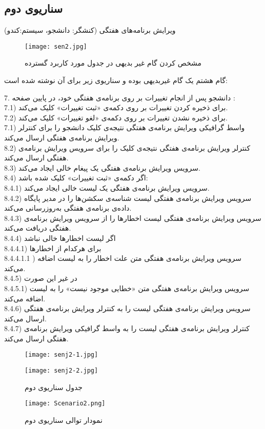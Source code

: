 \documentclass{report}
\begin{document}
\subsection*{سناریوی دوم}


\textbf{}
ویرایش برنامه‌های هفتگی (کنشگر: دانشجو، سیستم:کندو)
\begin{figure}[!htb]
\centering
\texttt{[image: sen2.jpg]}
\caption{مشخص کردن گام غیر بدیهی در جدول مورد کاربرد گسترده}
\end{figure} 
\clearpage
گام هشتم یک گام غیربدیهی بوده و سناریوی زیر برای آن نوشته شده است:

7. دانشجو پس از انجام تغییرات بر روی برنامه‌ی هفتگی خود، در پایین صفحه :\\
7.1) برای ذخیره‌ کردن تغییرات بر روی دکمه‌ی «ثبت تغییرات» کلیک می‌کند.\\
7.2) برای ذخیره نشدن تغییرات بر روی دکمه‌ی «لغو تغییرات» کلیک می‌کند.\\
7.1)  واسط گرافیکی ویرایش برنامه‌‌ی هفتگی نتیجه‌ی کلیک دانشجو را برای کنترلر ویرایش برنامه‌ی هفتگی ارسال می‌کند.\\
8.2) کنترلر ویرایش برنامه‌ی هفتگی نتیجه‌ی کلیک را برای سرویس ویرایش برنامه‌ی هفتگی ارسال می‌کند.\\
8.3) سرویس ویرایش برنامه‌ی هفتگی یک پیغام خالی 
 ایجاد می‌کند.\\
8.4) اگر دکمه‌ی «ثبت تغییرات» کلیک شده باشد:\\
8.4.1) سرویس ویرایش برنامه‌ی هفتگی یک لیست خالی 
 ایجاد می‌کند.\\
8.4.2) سرویس ویرایش برنامه‌ی هفتگی لیست شناسه‌ی سکشن‌ها را در مدیر پایگاه داده‌ی برنامه‌ی هفتگی به‌روزرسانی می‌کند.\\
8.4.3) سرویس ویرایش برنامه‌ی هفتگی لیست اخطارها را از سرویس ویرایش برنامه‌ی هفتگی دریافت می‌کند.\\
8.4.4) اگر لیست اخطارها خالی نباشد\\
8.4.4.1) برای هرکدام از اخطارها \\
8.4.4.1.1 ) سرویس ویرایش برنامه‌ی هفتگی متن علت اخطار را به لیست 
 اضافه می‌کند.\\
8.4.5) در غیر این صورت\\
8.4.5.1) سرویس ویرایش برنامه‌ی هفتگی متن «خطایی موجود نیست» را به لیست 
 اضافه می‌کند.\\
8.4.6) سرویس ویرایش برنامه‌ی هفتگی لیست 
 را به کنترلر ویرایش برنامه‌ی هفتگی ارسال می‌کند.\\
8.4.7) کنترلر ویرایش برنامه‌ی هفتگی لیست 
 را به واسط گرافیکی ویرایش برنامه‌ی هفتگی ارسال می‌کند.\\
\clearpage
\begin{figure}[!h]
\texttt{[image: senj2-1.jpg]}
\end{figure} 
\begin{figure}[!h]
\texttt{[image: senj2-2.jpg]}
\caption{جدول سناریوی دوم} 
\end{figure}
\clearpage
{}
\begin{figure}[!h]
\centering
\texttt{[image: Scenario2.png]}
\caption{نمودار توالی سناریوی دوم}
\end{figure}
\clearpage
\restoregeometry
\end{document}
